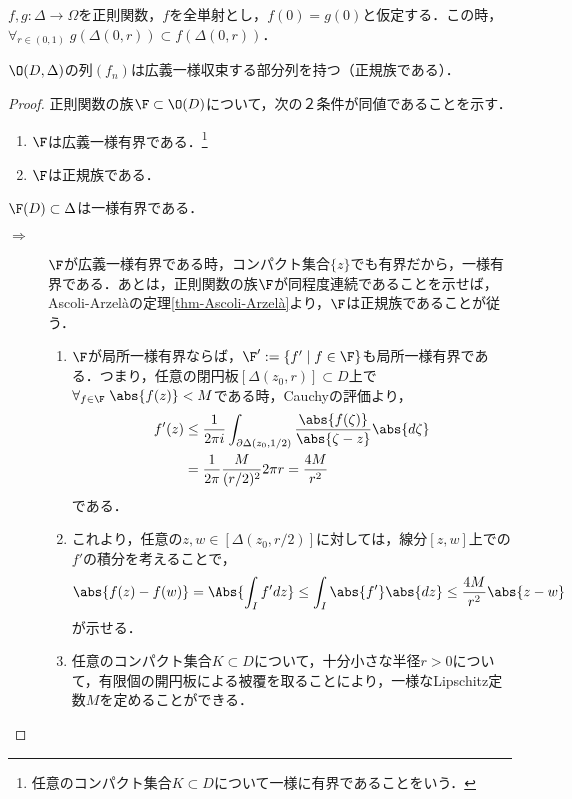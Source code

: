\documentclass[uplatex, dvipdfmx]{jsreport}
\begin{document}
\begin{proposition}
    $f,g:\Delta\to\Omega$を正則関数，$f$を全単射とし，$f(0)=g(0)$と仮定する．この時，$\forall_{r\in(0,1)}\;g(\Delta(0,r))\subset f(\Delta(0,r))$．
\end{proposition}

\begin{theorem}\label{thm-Montel}
    $\O(D,\Delta)$の列$(f_n)$は広義一様収束する部分列を持つ（正規族である）．
\end{theorem}
\begin{proof}
    正則関数の族$\F\subset\O(D)$について，次の２条件が同値であることを示す．
    \begin{enumerate}
        \item $\F$は広義一様有界である．\footnote{任意のコンパクト集合$K\subset D$について一様に有界であることをいう．}
        \item $\F$は正規族である．
    \end{enumerate}
    $\F(D)\subset\Delta$は一様有界である．
    \begin{description}
        \item[$\Rightarrow$] $\F$が広義一様有界である時，コンパクト集合$\{z\}$でも有界だから，一様有界である．あとは，正則関数の族$\F$が同程度連続であることを示せば，Ascoli-Arzelàの定理\ref{thm-Ascoli-Arzelà}より，$\F$は正規族であることが従う．
        \begin{enumerate}
            \item $\F$が局所一様有界ならば，$\F':=\{f'\mid f\in\F\}$も局所一様有界である．つまり，任意の閉円板$[\Delta(z_0,r)]\subset D$上で$\forall_{f\in\F}\;\abs{f(z)}<M$である時，Cauchyの評価より，
            \begin{align*}
                f'(z)&\le\frac{1}{2\pi i}\int_{\partial\Delta(z_0,1/2)}\frac{\abs{f(\zeta)}}{\abs{\zeta-z}}\abs{d\zeta}\\
                &=\frac{1}{2\pi}\frac{M}{(r/2)^2}2\pi r=\frac{4M}{r^2}
            \end{align*}
            である．
            \item これより，任意の$z,w\in[\Delta(z_0,r/2)]$に対しては，線分$[z,w]$上での$f'$の積分を考えることで，
            \[\abs{f(z)-f(w)}=\Abs{\int_If'dz}\le\int_I\abs{f'}\abs{dz}\le\frac{4M}{r^2}\abs{z-w}\]
            が示せる．
            \item 任意のコンパクト集合$K\subset D$について，十分小さな半径$r>0$について，有限個の開円板による被覆を取ることにより，一様なLipschitz定数$M$を定めることができる．

\end{enumerate}
\end{description}
\end{proof}
\end{document}
